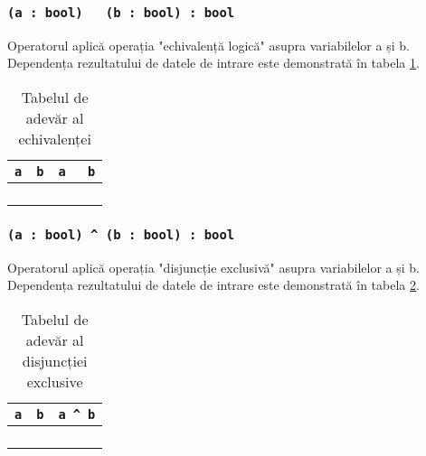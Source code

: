 \subsubsection{\texttt{(a : bool) ~ (b : bool) : bool}}

Operatorul aplică operația "echivalență logică" asupra variabilelor a și b. Dependența rezultatului de datele de intrare este demonstrată în tabela \ref{logeqtable}.

\begin{table}[htb]
	\caption{Tabelul de adevăr al echivalenței}
	\label{logeqtable}
	\begin{tabular}{|c|c|c|}
		\hline
		\texttt{a} & \texttt{b} & \texttt{a ~ b} \\ \hline
		\false{} & \false{} & \true{}   	\\ \hline
		\false{} & \true{}  & \false{}  	\\ \hline
		\true{}  & \false{} & \false{}  	\\ \hline
		\true{}  & \true{}  & \true{}   	\\ \hline
	\end{tabular}
	\vspace{-2em}
\end{table}

\subsubsection{\texttt{(a : bool) ^ (b : bool) : bool}}

Operatorul aplică operația "disjuncție exclusivă" asupra variabilelor a și b. Dependența rezultatului de datele de intrare este demonstrată în tabela \ref{logdifftable}.

\begin{table}[htb]
	\caption{Tabelul de adevăr al disjuncției exclusive}
	\label{logdifftable}
	\begin{tabular}{|c|c|c|}
		\hline
		\texttt{a} & \texttt{b} & \texttt{a ^ b} \\ \hline
		\false{} & \false{} & \false{}  	\\ \hline
		\false{} & \true{}  & \true{}   	\\ \hline
		\true{}  & \false{} & \true{}  		\\ \hline
		\true{}  & \true{}  & \false{}  	\\ \hline
	\end{tabular}
	\vspace{0em}
\end{table}

